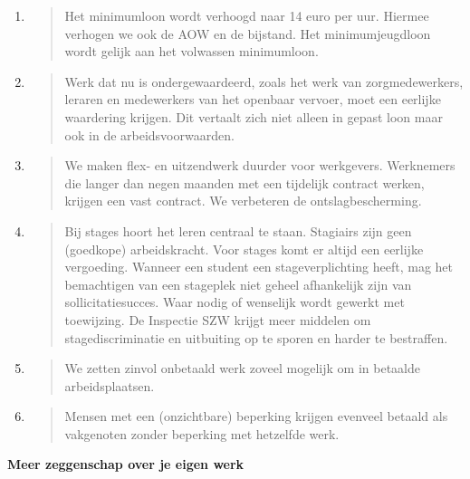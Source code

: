 \begin{enumerate}
\def\labelenumi{\arabic{enumi}.}
\item
  \begin{quote}
  Het minimumloon wordt verhoogd naar 14 euro per uur. Hiermee verhogen
  we ook de AOW en de bijstand. Het minimumjeugdloon wordt gelijk aan
  het volwassen minimumloon.
  \end{quote}
\item
  \begin{quote}
  Werk dat nu is ondergewaardeerd, zoals het werk van zorgmedewerkers,
  leraren en medewerkers van het openbaar vervoer, moet een eerlijke
  waardering krijgen. Dit vertaalt zich niet alleen in gepast loon maar
  ook in de arbeidsvoorwaarden.
  \end{quote}
\item
  \begin{quote}
  We maken flex- en uitzendwerk duurder voor werkgevers. Werknemers die
  langer dan negen maanden met een tijdelijk contract werken, krijgen
  een vast contract. We verbeteren de ontslagbescherming.
  \end{quote}
\item
  \begin{quote}
  Bij stages hoort het leren centraal te staan. Stagiairs zijn geen
  (goedkope) arbeidskracht. Voor stages komt er altijd een eerlijke
  vergoeding. Wanneer een student een stageverplichting heeft, mag het
  bemachtigen van een stageplek niet geheel afhankelijk zijn van
  sollicitatiesucces. Waar nodig of wenselijk wordt gewerkt met
  toewijzing. De Inspectie SZW krijgt meer middelen om
  stagediscriminatie en uitbuiting op te sporen en harder te bestraffen.
  \end{quote}
\item
  \begin{quote}
  We zetten zinvol onbetaald werk zoveel mogelijk om in betaalde
  arbeidsplaatsen.
  \end{quote}
\item
  \begin{quote}
  Mensen met een (onzichtbare) beperking krijgen evenveel betaald als
  vakgenoten zonder beperking met hetzelfde werk.
  \end{quote}
\end{enumerate}

\textbf{Meer zeggenschap over je eigen werk}

